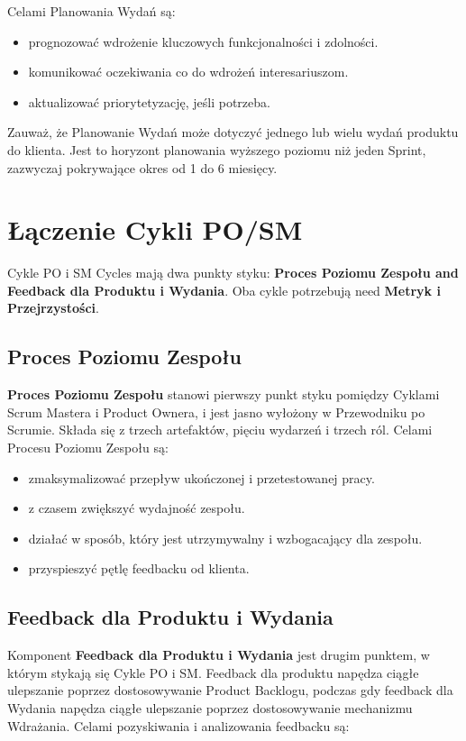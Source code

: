 \documentclass[12pt,a4paper,parskip=full]{scrartcl}
\begin{document}
Celami Planowania Wydań są:

\begin{itemize}
	\item prognozować wdrożenie kluczowych funkcjonalności i zdolności.
	\item komunikować oczekiwania co do wdrożeń interesariuszom.
	\item aktualizować priorytetyzację, jeśli potrzeba.
\end{itemize}

Zauważ, że Planowanie Wydań może dotyczyć jednego lub wielu wydań produktu do klienta. Jest to horyzont planowania wyższego poziomu niż jeden Sprint, zazwyczaj pokrywające okres od 1 do 6 miesięcy.

\section{Łączenie Cykli PO/SM}

Cykle PO i SM Cycles mają dwa punkty styku: \textbf{Proces Poziomu Zespołu and Feedback dla Produktu i Wydania}. Oba cykle potrzebują need \textbf{Metryk i Przejrzystości}.

\subsection{Proces Poziomu Zespołu}

\textbf{Proces Poziomu Zespołu} stanowi pierwszy punkt styku pomiędzy Cyklami Scrum Mastera i Product Ownera, i jest jasno wyłożony w Przewodniku po Scrumie. Składa się z trzech artefaktów, pięciu wydarzeń i trzech ról. Celami Procesu Poziomu Zespołu są:

\begin{itemize}
	\item zmaksymalizować przepływ ukończonej i przetestowanej pracy.
	\item z czasem zwiększyć wydajność zespołu.
	\item działać w sposób, który jest utrzymywalny i wzbogacający dla zespołu.
	\item przyspieszyć pętlę feedbacku od klienta.
\end{itemize}

\subsection{Feedback dla Produktu i Wydania}

Komponent \textbf{Feedback dla Produktu i Wydania} jest drugim punktem, w którym stykają się Cykle PO i SM. Feedback dla produktu napędza ciągłe ulepszanie poprzez dostosowywanie Product Backlogu, podczas gdy feedback dla Wydania napędza ciągłe ulepszanie poprzez dostosowywanie mechanizmu Wdrażania. Celami pozyskiwania i analizowania feedbacku są:
\end{document}
